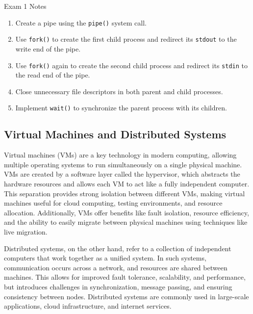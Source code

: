 \begin{examnotes}{Exam 1 Notes}
    \begin{highlight}
        \begin{enumerate}
            \item Create a pipe using the \texttt{pipe()} system call.
            \item Use \texttt{fork()} to create the first child process and redirect its \texttt{stdout} to the write end of the pipe.
            \item Use \texttt{fork()} again to create the second child process and redirect its \texttt{stdin} to the read end of the pipe.
            \item Close unnecessary file descriptors in both parent and child processes.
            \item Implement \texttt{wait()} to synchronize the parent process with its children.
        \end{enumerate}
    \end{highlight}

    \subsection*{Virtual Machines and Distributed Systems}

    Virtual machines (VMs) are a key technology in modern computing, allowing multiple operating systems to run simultaneously on a single physical machine. VMs are created by a software layer called 
    the hypervisor, which abstracts the hardware resources and allows each VM to act like a fully independent computer. This separation provides strong isolation between different VMs, making virtual 
    machines useful for cloud computing, testing environments, and resource allocation. Additionally, VMs offer benefits like fault isolation, resource efficiency, and the ability to easily migrate 
    between physical machines using techniques like live migration.
    
    Distributed systems, on the other hand, refer to a collection of independent computers that work together as a unified system. In such systems, communication occurs across a network, and resources 
    are shared between machines. This allows for improved fault tolerance, scalability, and performance, but introduces challenges in synchronization, message passing, and ensuring consistency between 
    nodes. Distributed systems are commonly used in large-scale applications, cloud infrastructure, and internet services.
    

\end{examnotes}
